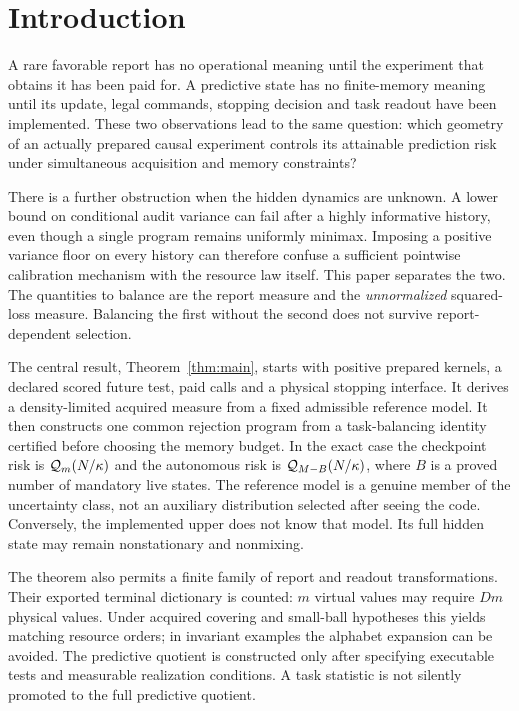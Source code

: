 \section{Introduction}
A rare favorable report has no operational meaning until the experiment that obtains it has been paid for. A predictive state has no finite-memory meaning until its update, legal commands, stopping decision and task readout have been implemented. These two observations lead to the same question: which geometry of an actually prepared causal experiment controls its attainable prediction risk under simultaneous acquisition and memory constraints?

There is a further obstruction when the hidden dynamics are unknown. A lower bound on conditional audit variance can fail after a highly informative history, even though a single program remains uniformly minimax. Imposing a positive variance floor on every history can therefore confuse a sufficient pointwise calibration mechanism with the resource law itself. This paper separates the two. The quantities to balance are the report measure and the \emph{unnormalized} squared-loss measure. Balancing the first without the second does not survive report-dependent selection.

The central result, Theorem~\ref{thm:main}, starts with positive prepared kernels, a declared scored future test, paid calls and a physical stopping interface. It derives a density-limited acquired measure from a fixed admissible reference model. It then constructs one common rejection program from a task-balancing identity certified before choosing the memory budget. In the exact case the checkpoint risk is $\mathcal Q_m(N/\kappa)$ and the autonomous risk is $\mathcal Q_{M-B}(N/\kappa)$, where $B$ is a proved number of mandatory live states. The reference model is a genuine member of the uncertainty class, not an auxiliary distribution selected after seeing the code. Conversely, the implemented upper does not know that model. Its full hidden state may remain nonstationary and nonmixing.

The theorem also permits a finite family of report and readout transformations. Their exported terminal dictionary is counted: $m$ virtual values may require $Dm$ physical values. Under acquired covering and small-ball hypotheses this yields matching resource orders; in invariant examples the alphabet expansion can be avoided. The predictive quotient is constructed only after specifying executable tests and measurable realization conditions. A task statistic is not silently promoted to the full predictive quotient.

